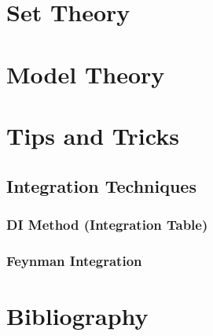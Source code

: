 \documentclass[12pt, english]{book}
\begin{document}
	\part{Set Theory}
	
	\part{Model Theory}
	
	\part{Tips and Tricks}
	
	\chapter{Integration Techniques}
	
	\section{DI Method (Integration Table)}
	
	\section{Feynman Integration}
	
	\part{Bibliography}
	
	\typeout{}
	
	
	
\end{document}
